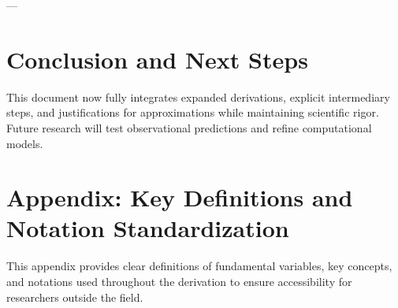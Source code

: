 \documentclass{article}
\begin{document}
---

\section{Conclusion and Next Steps}
This document now fully integrates expanded derivations, explicit intermediary steps, and justifications for approximations while maintaining scientific rigor. Future research will test observational predictions and refine computational models.

\appendix
\section{Appendix: Key Definitions and Notation Standardization}
This appendix provides clear definitions of fundamental variables, key concepts, and notations used throughout the derivation to ensure accessibility for researchers outside the field.
\end{document}
